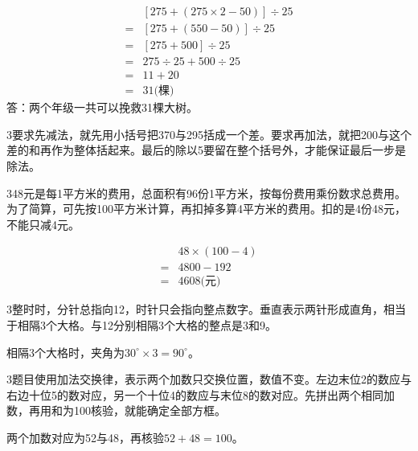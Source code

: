 \documentclass[multi=snippet,border={5bp 20bp 5bp 5bp}]{standalone}
\newenvironment{snippet}[3]{\begin{minipage}{#1bp}\color{answerred}\fontsize{#2}{#3}\selectfont\raggedright}{\end{minipage}}
\begin{document}
\begin{snippet}{356}{10.5}{12.8}\SourceSans\setlength{\mathindent}{2bp}\[\begin{aligned}&[275+(275\times2-50)]\div25\\={}&[275+(550-50)]\div25\\={}&[275+500]\div25\\={}&275\div25+500\div25\\={}&11+20\\={}&31\text{(棵)}\end{aligned}\]答：两个年级一共可以挽救31棵大树。\end{snippet}
\begin{snippet}{505}{11.5}{14}\begin{multicols}{3}\raggedcolumns 要求先减法，就先用小括号把370与295括成一个差。要求再加法，就把200与这个差的和再作为整体括起来。最后的除以5要留在整个括号外，才能保证最后一步是除法。\end{multicols}\end{snippet}
\begin{snippet}{505}{11.5}{14}\begin{multicols}{3}\raggedcolumns 48元是每1平方米的费用，总面积有96份1平方米，按每份费用乘份数求总费用。为了简算，可先按100平方米计算，再扣掉多算4平方米的费用。扣的是4份48元，不能只减4元。\par \[\begin{aligned}&48\times(100-4)\\={}&4800-192\\={}&4608\text{(元)}\end{aligned}\]\end{multicols}\end{snippet}
\begin{snippet}{505}{11.5}{14}\begin{multicols}{3}\raggedcolumns 整时时，分针总指向12，时针只会指向整点数字。垂直表示两针形成直角，相当于相隔3个大格。与12分别相隔3个大格的整点是3和9。\par 相隔3个大格时，夹角为\(30^\circ\times3=90^\circ\)\allowbreak 。\end{multicols}\end{snippet}
\begin{snippet}{505}{11.5}{14}\begin{multicols}{3}\raggedcolumns 题目使用加法交换律，表示两个加数只交换位置，数值不变。左边末位2的数应与右边十位5的数对应，另一个十位4的数应与末位8的数对应。先拼出两个相同加数，再用和为100核验，就能确定全部方框。\par 两个加数对应为52与48，再核验\(52+48=100\)\allowbreak 。\end{multicols}\end{snippet}
\end{document}
